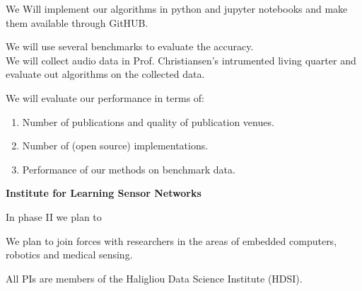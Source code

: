 \documentclass{article}
\begin{document}
We Will implement our algorithms in python and jupyter notebooks and
make them available through GitHUB.

We will use several benchmarks to evaluate the accuracy.
\\
We will collect audio data in Prof. Christiansen's intrumented living
quarter and evaluate out algorithms on the collected data.

We will evaluate our performance in terms of:
\begin{enumerate}
\item Number of publications and quality of publication venues.
\item Number of (open source) implementations.
\item Performance of our methods on benchmark data.
\end{enumerate}

{\bf Institute for Learning Sensor Networks}\\

In phase II we plan to 

We plan to join forces with researchers in the areas of embedded
computers, robotics and medical sensing.

All PIs are members of the Haligliou Data Science Institute (HDSI).

\bigskip
\end{document}
